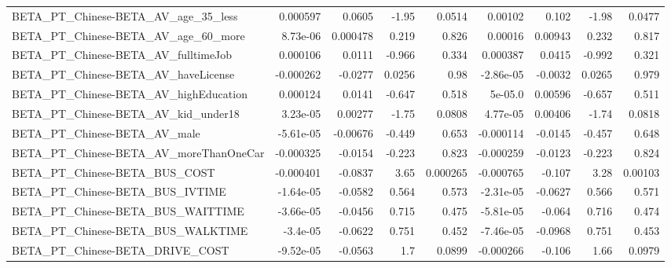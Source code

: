 \begin{tabular}{lrrrrrrrr}
BETA\_PT\_Chinese-BETA\_AV\_age\_35\_less                &    0.000597 &       0.0605 &    -1.95 &   0.0514 &    0.00102 &       0.102 &        -1.98 &        0.0477 \\
BETA\_PT\_Chinese-BETA\_AV\_age\_60\_more                &    8.73e-06 &     0.000478 &    0.219 &    0.826 &    0.00016 &     0.00943 &        0.232 &         0.817 \\
BETA\_PT\_Chinese-BETA\_AV\_fulltimeJob                &    0.000106 &       0.0111 &   -0.966 &    0.334 &   0.000387 &      0.0415 &       -0.992 &         0.321 \\
BETA\_PT\_Chinese-BETA\_AV\_haveLicense                &   -0.000262 &      -0.0277 &   0.0256 &     0.98 &  -2.86e-05 &     -0.0032 &       0.0265 &         0.979 \\
BETA\_PT\_Chinese-BETA\_AV\_highEducation              &    0.000124 &       0.0141 &   -0.647 &    0.518 &    5e-05.0 &     0.00596 &       -0.657 &         0.511 \\
BETA\_PT\_Chinese-BETA\_AV\_kid\_under18                &    3.23e-05 &      0.00277 &    -1.75 &   0.0808 &   4.77e-05 &     0.00406 &        -1.74 &        0.0818 \\
BETA\_PT\_Chinese-BETA\_AV\_male                       &   -5.61e-05 &     -0.00676 &   -0.449 &    0.653 &  -0.000114 &     -0.0145 &       -0.457 &         0.648 \\
BETA\_PT\_Chinese-BETA\_AV\_moreThanOneCar             &   -0.000325 &      -0.0154 &   -0.223 &    0.823 &  -0.000259 &     -0.0123 &       -0.223 &         0.824 \\
BETA\_PT\_Chinese-BETA\_BUS\_COST                      &   -0.000401 &      -0.0837 &     3.65 & 0.000265 &  -0.000765 &      -0.107 &         3.28 &       0.00103 \\
BETA\_PT\_Chinese-BETA\_BUS\_IVTIME                    &   -1.64e-05 &      -0.0582 &    0.564 &    0.573 &  -2.31e-05 &     -0.0627 &        0.566 &         0.571 \\
BETA\_PT\_Chinese-BETA\_BUS\_WAITTIME                  &   -3.66e-05 &      -0.0456 &    0.715 &    0.475 &  -5.81e-05 &      -0.064 &        0.716 &         0.474 \\
BETA\_PT\_Chinese-BETA\_BUS\_WALKTIME                  &    -3.4e-05 &      -0.0622 &    0.751 &    0.452 &  -7.46e-05 &     -0.0968 &        0.751 &         0.453 \\
BETA\_PT\_Chinese-BETA\_DRIVE\_COST                    &   -9.52e-05 &      -0.0563 &      1.7 &   0.0899 &  -0.000266 &      -0.106 &         1.66 &        0.0979 \\

\end{tabular}
